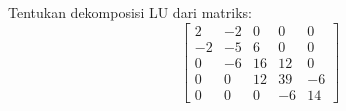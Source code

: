 Tentukan dekomposisi LU dari matriks:
$$
\begin{bmatrix}
2 & -2 & 0 & 0 & 0 \\
-2 & -5 & 6 & 0 & 0 \\
0 & -6 & 16 & 12 & 0 \\
0 & 0 & 12 & 39 & -6 \\
0 & 0 & 0 & -6 & 14
\end{bmatrix}
$$
